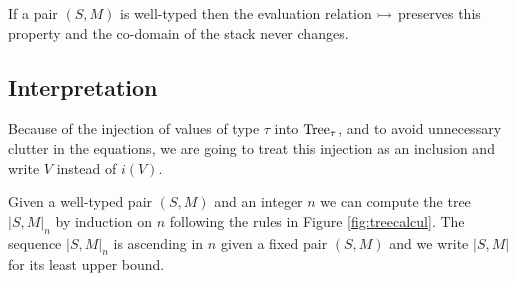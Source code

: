 \begin{alemma}[Safety]
    If a pair $(S,M)$ is well-typed then the
    evaluation relation $\rightarrowtail$ preserves this property 
    and the co-domain of the stack never changes.
\end{alemma}

%
%    


\subsection{Interpretation}

Because of the injection of values of type $\tau$ into $\textnormal{Tree}_\tau$,
and to avoid unnecessary clutter in the equations, we are going to treat 
this injection as an inclusion and write $V$ instead of $i(V)$.


\begin{adefinition}
    Given a well-typed pair $(S,M)$ and an integer $n$ we can 
    compute the tree $|S,M|_n$ by induction on $n$ 
    following the rules in Figure \ref{fig:treecalcul}.
    The sequence $|S,M|_n$ is ascending in $n$ given a fixed 
    pair $(S,M)$ and we write $|S,M|$ for its least upper bound.
\end{adefinition}

